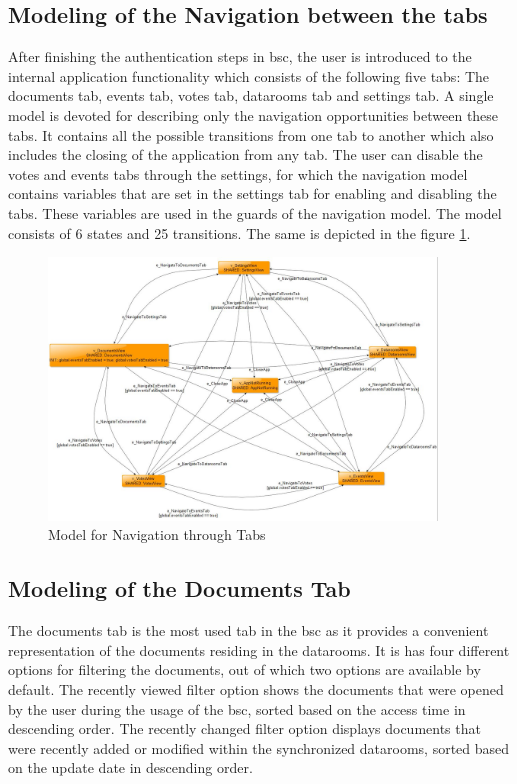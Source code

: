 \subsection{Modeling of the Navigation between the tabs}
\par
After finishing the authentication steps in \acrshort{bsc}, the user is introduced to the internal application functionality which consists of the following five tabs: The documents tab, events tab, votes tab, datarooms tab and settings tab. A single model is devoted for describing only the navigation opportunities between these tabs. It contains all the possible transitions from one tab to another which also includes the closing of the application from any tab. The user can disable the votes and events tabs through the settings, for which the navigation model contains variables that are set in the settings tab for enabling and disabling the tabs. These variables are used in the guards of the navigation model. The model consists of 6 states and 25 transitions. The same is depicted in the figure \ref{Fig:Navigation_Model_Screenshot}.

\begin{figure} [htbp!]
	\centering
					\includegraphics[width=0.92\textwidth]{figures/Navigation_model_screenshot}
					\caption{\label{Fig:Navigation_Model_Screenshot} Model for Navigation through Tabs}
\end{figure}

\subsection{Modeling of the Documents Tab}
\par
The documents tab is the most used tab in the \acrshort{bsc} as it provides a convenient representation of the documents residing in the datarooms. It is has four different options for filtering the documents, out of which two options are available by default. The recently viewed filter option shows the documents that were opened by the user during the usage of the \acrshort{bsc}, sorted based on the access time in descending order. The recently changed filter option displays documents that were recently added or modified within the synchronized datarooms, sorted based on the update date in descending order.

